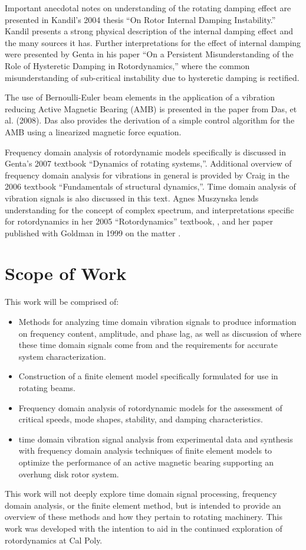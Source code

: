 Important anecdotal notes on understanding of the rotating damping effect are presented in Kandil's 2004\cite{kandil2005rotor} thesis ``On Rotor Internal Damping Instability.'' Kandil presents a strong physical description of the internal damping effect and the many sources it has. Further interpretations for the effect of internal damping were presented by Genta in his paper ``On a Persistent Misunderstanding of the Role of Hysteretic Damping in Rotordynamics,'' where the common misunderstanding of sub-critical instability due to hysteretic damping is rectified.\par 
The use of Bernoulli-Euler beam elements in the application of a vibration reducing Active Magnetic Bearing (AMB) is presented in the paper from Das, et al. (2008\cite{das2008vibration}). Das also provides the derivation of a simple control algorithm for the AMB using a linearized magnetic force equation.\par
Frequency domain analysis of rotordynamic models specifically is discussed in Genta's 2007 textbook ``Dynamics of rotating systems,''\cite{genta2007dynamics}. Additional overview of frequency domain analysis for vibrations in general is provided by Craig in the 2006 textbook ``Fundamentals of structural dynamics,''\cite{craig2006fundamentals}. Time domain analysis of vibration signals is also discussed in this text. Agnes Muszynska lends understanding for the concept of complex spectrum, and interpretations specific for rotordynamics in her 2005 ``Rotordynamics'' textbook, \cite{muszynska2005rotordynamics}, and her paper published with Goldman in 1999 on the matter \cite{goldman1999application}.
\section{Scope of Work}
This work will be comprised of: 
\begin{itemize}
	\item Methods for analyzing time domain vibration signals to produce information on frequency content, amplitude, and phase lag, as well as discussion of where these time domain signals come from and the requirements for accurate system characterization.
	\item Construction of a finite element model specifically formulated for use in rotating beams.
	\item Frequency domain analysis of rotordynamic models for the assessment of critical speeds, mode shapes, stability, and damping characteristics.
	\item time domain vibration signal analysis from experimental data and synthesis with frequency domain analysis techniques of finite element models to optimize the performance of an active magnetic bearing supporting an overhung disk rotor system.
\end{itemize}
This work will not deeply explore time domain signal processing, frequency domain analysis, or the finite element method, but is intended to provide an overview of these methods and how they pertain to rotating machinery. This work was developed with the intention to aid in the continued exploration of rotordynamics at Cal Poly.\par